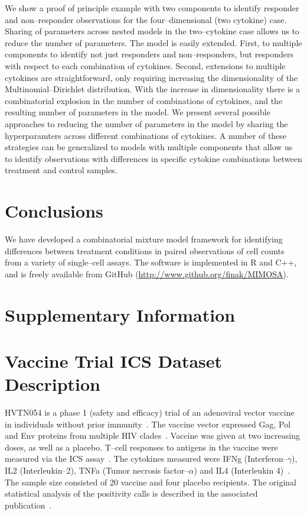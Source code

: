 \documentclass[11pt]{article}
\begin{document}
We show a proof of principle example with two components to identify responder and non--responder observations for the four--dimensional (two cytokine) case. Sharing of parameters across nested models in the two--cytokine case allows us to reduce the number of parameters. The model is easily extended. First, to multiple components to identify not just responders and non--responders, but responders with respect to each combination of cytokines. Second, extensions to multiple cytokines are straightforward, only requiring increasing the dimensionality of the Multinomial--Dirichlet distribution. With the increase in dimensionality there is a combinatorial explosion in the number of combinations of cytokines, and the resulting number of parameters in the model. We present several possible approaches to reducing the number of parameters in the model by sharing the hyperparamters across different combinations of cytokines. A number of these strategies can be generalized to models with multiple components that allow us to identify observations with differences in specific cytokine combinations between treatment and control samples.

\section*{Conclusions}
We have developed a combinatorial mixture model framework for identifying differences between treatment conditions in paired observations of cell counts from a variety of single--cell assays. The software is implemented in R and C++, and is freely available from GitHub (\url{http://www.github.org/finak/MIMOSA}). 
\renewcommand{\thesection}{S.\arabic{section}}
\renewcommand{\thesubsection}{\thesection.\arabic{subsection}}
\setcounter{section}{0}
\setcounter{subsection}{0}
\section*{Supplementary Information}
\section{Vaccine Trial ICS Dataset Description}
\label{supp:data}
HVTN054 is a phase 1 (safety and efficacy) trial of an adenoviral vector vaccine in individuals without prior immunity~\cite{Peiperl:2010ej}. The vaccine vector expressed Gag, Pol and Env proteins from multiple HIV clades~\cite{Peiperl:2010ej}. Vaccine was given at two increasing doses, as well as a placebo. T--cell responses to antigens in the vaccine were measured via the ICS assay~\cite{Peiperl:2010ej,Horton:2007tsa}. The cytokines measured were IFNg (Interferon--$\gamma$), IL2 (Interleukin--2), TNFa (Tumor necrosis factor--$\alpha$) and IL4 (Interleukin 4)~\cite{Horton:2007tsa}. The sample size consisted of 20 vaccine and four placebo recipients. The original statistical analysis of the positivity calls is described in the associated publication~\cite{Peiperl:2010ej}.
 
\end{document}

